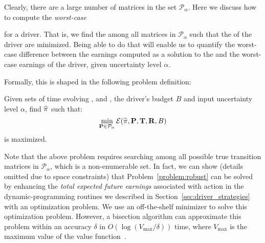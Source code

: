 Clearly, there are a large number of matrices in the set $\mathcal{P}_\alpha$.
Here we discuss how to compute the \emph{worst-case}{ {\totalexpectedearnings} for a driver. That is, we find the {\truetransitionmatrix} among all matrices in $\mathcal{P}_\alpha$ such that the {\totalexpectedearnings} of the driver
are minimized. Being able to do that will enable us to 
quantify the worst-case difference between the earnings computed
as a solution to the {\originalproblem} and the worst-case earnings of the
driver, given uncertainty level $\alpha$.


Formally, this is shaped in the following problem definition:

\begin{problem}[{\robustproblem}]\label{problem:robust}
Given sets of time evolving {\countmatrix}, {\traveltimematrix} and {\rewardsmatrix}, the driver's budget $B$ and input uncertainty level $\alpha$,
find $\widehat{\pi}$
such that:
\[
\min_{{\mathbf{P}}\in\mathcal{P}_\alpha}\mathcal{E}(\widehat{\pi},{\mathbf{P}},{\mathbf{T}},{\mathbf{R}},B)
\]
is maximized.
\end{problem}
Note that the above problem requires searching among all possible true transition 
matrices in $\mathcal{P}_\alpha$, which is a non-enumerable set. 
In fact, we can show (details omitted due to space constraints) that 
Problem~\ref{problem:robust} can be solved by enhancing the \emph{total expected future earnings} associated with {\getpassenger} action in the  dynamic-programming routines we described in Section~\ref{sec:driver_strategies}
with an optimization problem. We use an off-the-shelf minimizer to solve this optimization problem. However, a bisection algorithm can approximate this problem within an accuracy $\delta$ in $O(\log(V_{\max}/\delta))$ time, where $V_{\max}$ is the maximum value of the value function~\cite{nilim2004robustness}.


}
